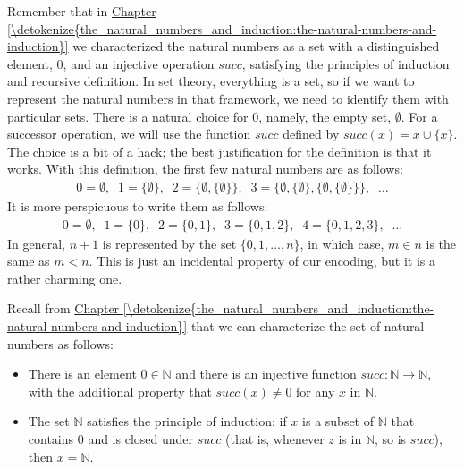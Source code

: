 \documentclass[letterpaper,10pt,english]{sphinxmanual}
\begin{document}
\sphinxAtStartPar
Remember that in \hyperref[\detokenize{the_natural_numbers_and_induction:the-natural-numbers-and-induction}]{Chapter \ref{\detokenize{the_natural_numbers_and_induction:the-natural-numbers-and-induction}}} we characterized the natural numbers as a set with a distinguished element, \(0\), and an injective operation \(\mathit{succ}\), satisfying the principles of induction and recursive definition. In set theory, everything is a set, so if we want to represent the natural numbers in that framework, we need to identify them with particular sets. There is a natural choice for \(0\), namely, the empty set, \(\emptyset\). For a successor operation, we will use the function \(\mathit{succ}\) defined by \(\mathit{succ}(x) = x \cup \{ x \}\). The choice is a bit of a hack; the best justification for the definition is that it works. With this definition, the first few natural numbers are as follows:
\begin{equation*}
\begin{split}0 = \emptyset, \;\; 1 = \{ \emptyset \}, \;\; 2 = \{ \emptyset, \{ \emptyset \} \}, \;\; 3 = \{ \emptyset, \{ \emptyset \}, \{ \emptyset, \{ \emptyset \} \} \}, \;\; \ldots\end{split}
\end{equation*}
\sphinxAtStartPar
It is more perspicuous to write them as follows:
\begin{equation*}
\begin{split}0 = \emptyset, \;\; 1 = \{ 0 \}, \;\; 2 = \{ 0, 1 \}, \;\; 3 = \{ 0, 1, 2 \}, \;\; 4 = \{ 0, 1, 2, 3 \}, \;\; \ldots\end{split}
\end{equation*}
\sphinxAtStartPar
In general, \(n+1\) is represented by the set \(\{ 0, 1, \ldots, n \}\), in which case, \(m \in n\) is the same as \(m < n\). This is just an incidental property of our encoding, but it is a rather charming one.

\sphinxAtStartPar
Recall from \hyperref[\detokenize{the_natural_numbers_and_induction:the-natural-numbers-and-induction}]{Chapter \ref{\detokenize{the_natural_numbers_and_induction:the-natural-numbers-and-induction}}} that we can characterize the set of natural numbers as follows:
\begin{itemize}
\item {} 
\sphinxAtStartPar
There is an element \(0 \in \mathbb{N}\) and there is an injective function \(\mathit{succ} : \mathbb{N} \to \mathbb{N}\), with the additional property that \(\mathit{succ}(x) \ne 0\) for any \(x\) in \(\mathbb{N}\).

\item {} 
\sphinxAtStartPar
The set \(\mathbb{N}\) satisfies the principle of induction: if \(x\) is a subset of \(\mathbb{N}\) that contains \(0\) and is closed under \(\mathit{succ}\) (that is, whenever \(z\) is in \(\mathbb{N}\), so is \(\mathit{succ}\)), then \(x = \mathbb{N}\).

\end{itemize}
\end{document}
